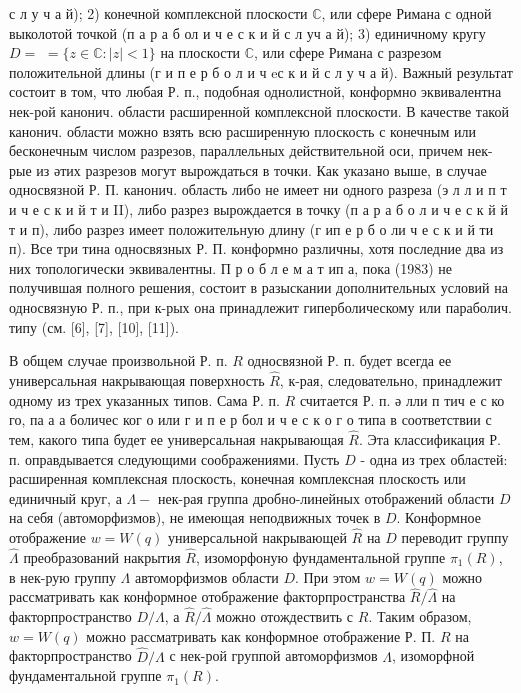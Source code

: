 \documentclass[10pt]{article}
\begin{document}
с л у ч а й); 2) конечной комплексной плоскости $\mathbb{C}$, или сфере Римана с одной выколотой точкой (п а р а б ол и ч е с к и й с л уч а й); 3) единичному кругу $D=$ $=\{z \in \mathbb{C}:|z|<1\}$ на плоскости $\mathbb{C}$, или сфере Римана с разрезом положительной длины (г и п е р б о л и ч eс к и й с л у ч а й). Важный результат состоит в том, что любая Р. п., подобная однолистной, конформно эквивалентна нек-рой канонич. области расширенной комплексной плоскости. В качестве такой канонич. области можно взять всю расширенную плоскость с конечным или бесконечным числом разрезов, параллельных действительной оси, причем нек-рые из әтих разрезов могут вырождаться в точки. Как указано выше, в случае односвязной Р. П. канонич. область либо не имеет ни одного разреза (э л л и п т и ч е с к и й т и II), либо разрез вырождается в точку (п а р а б о л и ч е с к й й т и п), либо разрез имеет положительную длину (г ип е р б о ли ч е с к и й ти п). Все три тина односвязных Р. П. конформно различны, хотя последние два из них топологически эквивалентны. П р о б л е м а т ип а, пока (1983) не получившая полного решения, состоит в разыскании дополнительных условий на односвязную Р. п., при к-рых она принадлежит гиперболическому или параболич. типу (см. [6], [7], [10], [11]).



В общем случае произвольной Р. п. $R$ односвязной Р. п. будет всегда ее универсальная накрывающая поверхность $\hat{R}$, к-рая, следовательно, принадлежит одному из трех указанных типов. Сама Р. п. $R$ считается Р. п. ә лли п тич е с ко го, па а а боличес ког о или г и п е р бол и ч е с к о г о типа в соответствии с тем, какого типа будет ее универсальная накрывающая $\widehat{R}$. Эта классификация Р. п. оправдывается следующими соображениями. Пусть $D$ - одна из трех областей: расширенная комплексная плоскость, конечная комплексная плоскость или единичный круг, а $\Lambda-$ нек-рая группа дробно-линейных отображений области $D$ на себя (автоморфизмов), не имеющая неподвижных точек в $D$. Конформное отображение $w=W(q)$ универсальной накрывающей $\widehat{R}$ на $D$ переводит группу $\widehat{\Lambda}$ преобразований накрытия $\hat{R}$, изоморфоную фундаментальной группе $\pi_{1}(R)$, в нек-рую группу $\Lambda$ автоморфизмов области $D$. При этом $w=W(q)$ можно рассматривать как конформное отображение факторпространства $\hat{R} / \hat{\Lambda}$ на факторпространство $D / \Lambda$, а $\hat{R} / \hat{\Lambda}$ можно отождествить с $R$. Таким образом, $w=W(q)$ можно рассматривать как конформное отображение Р. П. $R$ на факторпространство $\hat{D} / \Lambda$ с нек-рой группой автоморфизмов $\Lambda$, изоморфной фундаментальной группе $\pi_{1}(R)$.
\end{document}
